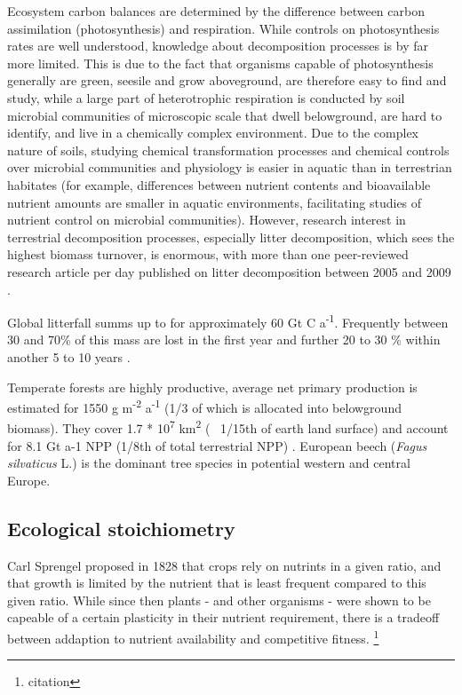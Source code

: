 Ecosystem carbon balances are determined by the difference between carbon assimilation (photosynthesis) and respiration. While controls on photosynthesis rates are well understood, knowledge about decomposition processes is by far more limited. This is due to the fact that organisms capable of photosynthesis generally are green, seesile and grow aboveground, are therefore easy to find and study, while a large part of heterotrophic respiration is conducted by soil microbial communities of microscopic scale that dwell belowground, are  hard to identify, and live in a chemically complex environment. Due to the complex nature of soils, studying chemical transformation processes and chemical controls over microbial communities and physiology is easier in aquatic than in terrestrian habitates (for example, differences between nutrient contents and bioavailable nutrient amounts are smaller in aquatic environments, facilitating studies of nutrient control on microbial communities). However, research interest in terrestrial decomposition processes, especially litter decomposition, which sees the highest biomass turnover, is enormous, with more than one peer-reviewed research article per day published on litter decomposition between 2005 and 2009 \citep{Prescott2010}. 

Global litterfall summs up to for approximately 60 Gt C a\textsuperscript{-1}. Frequently between 30 and 70\% of this mass are lost in the first year and further 20 to 30 \% within another 5 to 10 years \citep[p.157]{Chapin2002}.

Temperate forests are highly productive, average net primary production is estimated for 1550 g m\textsuperscript{-2} a\textsuperscript{-1} (1/3 of which is allocated into belowground biomass). They cover 1.7 * 10\textsuperscript{7} km\textsuperscript{2} (~ 1/15th of earth land surface) and account for 8.1 Gt a-1 NPP (1/8th of total terrestrial NPP) \citep[p?]{Chapin2002}. European beech (\emph{Fagus silvaticus} L.) is the dominant tree species in potential western and central Europe. 

\subsection{Ecological stoichiometry}

Carl Sprengel proposed in 1828 that crops rely on nutrints in a given ratio, and that growth is limited by the nutrient that is least frequent compared to this given ratio. While since then plants - and other organisms - were shown to be capeable of a certain plasticity in their nutrient requirement, there is a tradeoff between addaption to nutrient availability and competitive fitness. \footnote{citation}

